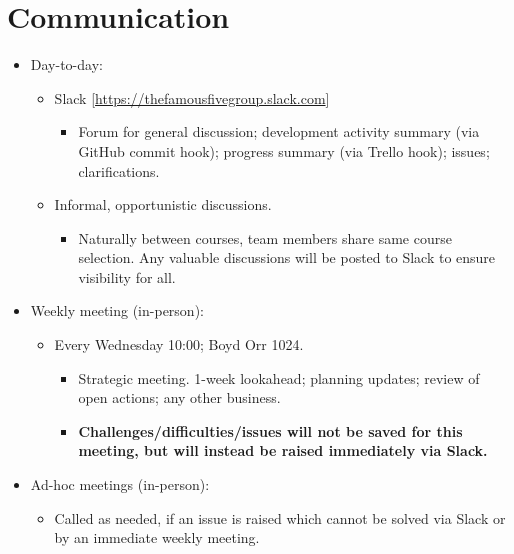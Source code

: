 \documentclass[a4paper, 12pt, titlepage]{article}
\begin{document}
    \section{Communication}
    \begin{itemize}
        \item Day-to-day:
        \begin{itemize}
            \item Slack [\url{https://thefamousfivegroup.slack.com}]
            \begin{itemize}
                \item Forum for general discussion; development activity summary (via GitHub commit hook); progress summary (via Trello hook); issues; clarifications.
            \end{itemize}
        \end{itemize}
        \begin{itemize}
            \item Informal, opportunistic discussions.
            \begin{itemize}
                \item Naturally between courses, team members share same course selection. Any valuable discussions will be posted to Slack to ensure visibility for all.
            \end{itemize}
        \end{itemize}

        \item Weekly meeting (in-person):
        \begin{itemize}
            \item Every Wednesday 10:00; Boyd Orr 1024.
            \begin{itemize}
                \item Strategic meeting. 1-week lookahead; planning updates; review of open actions; any other business.
                \item \textbf{Challenges/difficulties/issues will not be saved for this meeting, but will instead be raised immediately via Slack.}
            \end{itemize}
        \end{itemize}

        \item Ad-hoc meetings (in-person):
        \begin{itemize}
            \item Called as needed, if an issue is raised which cannot be solved via Slack or by an immediate weekly meeting.
        \end{itemize}
    \end{itemize}
\end{document}

